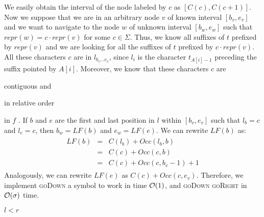 We easily obtain the interval of the node labeled by $c$ as $[C(c),C(c+1)]$.
Now we suppose that we are in an arbitrary node $v$ of known interval $[b_v, e_v]$ and we want to navigate to the node $w$ of unknown interval $[b_w, e_w]$ such that $repr(w)=c \cdot repr(v)$ for some $c \in \Sigma$.
Thus, we know all suffixes of $t$ prefixed by $repr(v)$ and we are looking for all the suffixes of $t$ prefixed by $c \cdot repr(v)$.
All these characters $c$ are in $l_{b_v \dots e_v}$, since $l_i$ is the character $t_{A[i] - 1}$ preceding the suffix pointed by $A[i]$.
Moreover, we know that these characters $c$ are
\begin{inparaenum}[(i)]
\item contiguous and
\item in relative order
\end{inparaenum}
in $f$ \citep{Ferragina2000}.
If $b$ and $e$ are the first and last position in $l$ within $[b_v, e_v]$ such that $l_b = c$ and $l_e = c$, then $b_w = LF(b)$ and $e_w = LF(e)$.
We can rewrite $LF(b)$ as:
\begin{eqnarray}
\begin{array}{lcl}
LF(b) &=& C(l_b) + Occ(l_b, b)\\
 	  &=& C(c) + Occ(c, b)\\
	  &=& C(c) + Occ(c, b_v - 1) + 1
\end{array}
\end{eqnarray}
Analogously, we can rewrite $LF(e)$ as $C(c) + Occ(c, e_v)$.
Therefore, we implement \textsc{goDown} a symbol to work in time $\mathcal{O}(1)$, and \textsc{goDown} \textsc{goRight} in $\mathcal{O}(\sigma)$ time.

\begin{algorithm}[h!]
\begin{minipage}[t]{.5\textwidth}
\label{alg:fm-goroot}
\begin{algorithmic}[1]
\EndProcedure
\end{algorithmic}
\end{minipage}
\begin{minipage}[t]{.5\textwidth}
\label{alg:fm-godownc}
\begin{algorithmic}[1]
		\State \Return \False
	\EndIf
	\State \Return $l < r$
\EndProcedure
\end{algorithmic}
\end{minipage}
\end{algorithm}

